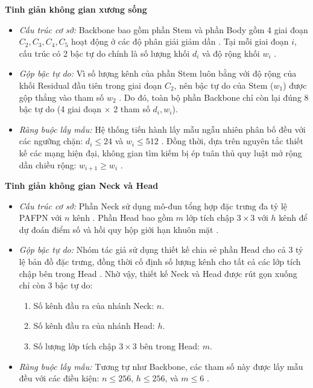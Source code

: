 \noindent\textbf{Tinh giản không gian xương sống}
\begin{itemize}
    \item \textit{Cấu trúc cơ sở:} Backbone bao gồm phần Stem và phần Body gồm 4 giai đoạn $C_2, C_3, C_4, C_5$ hoạt động ở các độ phân giải giảm dần \cite{guo2022scrfd}. Tại mỗi giai đoạn $i$, cấu trúc có 2 bậc tự do chính là số lượng khối $d_i$ và độ rộng khối $w_i$ \cite{guo2022scrfd}.
    \item \textit{Gộp bậc tự do:} Vì số lượng kênh của phần Stem luôn bằng với độ rộng của khối Residual đầu tiên trong giai đoạn $C_2$, nên bậc tự do của Stem ($w_1$) được gộp thẳng vào tham số $w_2$ \cite{guo2022scrfd}. Do đó, toàn bộ phần Backbone chỉ còn lại đúng 8 bậc tự do (4 giai đoạn $\times$ 2 tham số $d_i, w_i$).
    \item \textit{Ràng buộc lấy mẫu:} Hệ thống tiến hành lấy mẫu ngẫu nhiên phân bố đều với các ngưỡng chặn: $d_i \le 24$ và $w_i \le 512$ \cite{guo2022scrfd}. Đồng thời, dựa trên nguyên tắc thiết kế các mạng hiện đại, không gian tìm kiếm bị ép tuân thủ quy luật mở rộng dần chiều rộng: $w_{i+1} \ge w_i$ \cite{guo2022scrfd}.
\end{itemize}

\noindent \textbf{Tinh giản không gian Neck và Head}
\begin{itemize}
    \item \textit{Cấu trúc cơ sở:} Phần Neck sử dụng mô-đun tổng hợp đặc trưng đa tỷ lệ PAFPN với $n$ kênh \cite{guo2022scrfd}. Phần Head bao gồm $m$ lớp tích chập $3 \times 3$ với $h$ kênh để dự đoán điểm số và hồi quy hộp giới hạn khuôn mặt \cite{guo2022scrfd}.
    \item \textit{Gộp bậc tự do:} Nhóm tác giả sử dụng thiết kế chia sẻ phần Head cho cả 3 tỷ lệ bản đồ đặc trưng, đồng thời cố định số lượng kênh cho tất cả các lớp tích chập bên trong Head \cite{guo2022scrfd}. Nhờ vậy, thiết kế Neck và Head được rút gọn xuống chỉ còn 3 bậc tự do:
    \begin{enumerate}
        \item Số kênh đầu ra của nhánh Neck: $n$.
        \item Số kênh đầu ra của nhánh Head: $h$.
        \item Số lượng lớp tích chập $3 \times 3$ bên trong Head: $m$.
    \end{enumerate}
    \item \textit{Ràng buộc lấy mẫu:} Tương tự như Backbone, các tham số này được lấy mẫu đều với các điều kiện: $n \le 256$, $h \le 256$, và $m \le 6$ \cite{guo2022scrfd}.
\end{itemize}

